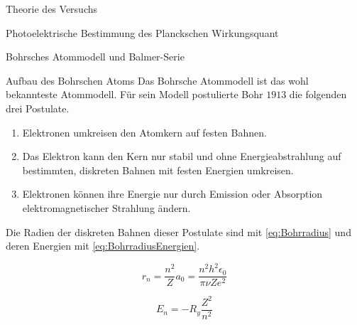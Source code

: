 \documentclass[pdftex, a4paper,11pt, twoside, ngerman]{report}
\begin{document}
\begin{chapter}{Theorie des Versuchs}
\begin{section}{Photoelektrische Bestimmung des Planckschen Wirkungsquant}
    \end{section}
   
   
   
    \begin{section}{Bohrsches Atommodell und Balmer-Serie}
      \label{chp:TheorieBohrBalmerSerie}
     
     
     
      \begin{subsection}{Aufbau des Bohrschen Atoms}
        \label{chp:TheorieBohrBalmerSerieAufbauAtomhuelle}
        Das Bohrsche Atommodell ist das wohl bekannteste Atommodell. Für sein
        Modell postulierte Bohr $1913$ die folgenden drei Postulate.
        \begin{enumerate}
          \item Elektronen umkreisen den Atomkern auf festen Bahnen.
          \item Das Elektron kann den Kern nur stabil und ohne
              Energieabstrahlung auf bestimmten, diskreten Bahnen mit festen
              Energien umkreisen.
          \item Elektronen können ihre Energie nur durch Emission oder
              Absorption elektromagnetischer Strahlung ändern.
        \end{enumerate}
        Die Radien der diskreten Bahnen dieser Postulate sind mit
        \cref{eq:Bohrradius} und deren Energien mit
        \cref{eq:BohrradiusEnergien}.
        \newline
        \begin{minipage}{.48\textwidth}
          \begin{equation}
            \label{eq:Bohrradius}
            r_{n}=\frac{n^{2}}{Z}a_{0}=\frac{n^{2}h^{2}\epsilon_{0}}
                {\pi\nu Ze^{2}}
          \end{equation}
        \end{minipage}
        \begin{minipage}{.48\textwidth}
          \begin{equation}
            \label{eq:BohrradiusEnergien}
            E_{n}=-R_{y}\frac{Z^{2}}{n^{2}}
          \end{equation}
        \end{minipage}
       

\end{subsection}
\end{section}
\end{chapter}
\end{document}

